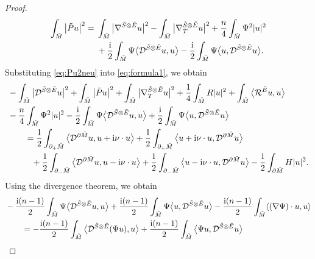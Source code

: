 \documentclass[pdftex]{sigma}
\numberwithin{equation}{section}
\begin{document}
\begin{proof}
\begin{align}
\int_{\tilde{M}} \big|\tilde{P} u\big|^2
={}& \int_{\tilde{M}} \big|\nabla^{\tilde{S} \otimes \tilde{E}} u\big|^2 - \int_{\tilde{M}} \big|\nabla_T^{\tilde{S} \otimes \tilde{E}} u\big|^2 + \frac{n}{4} \int_{\tilde{M}} \Psi^2 |u|^2\nonumber \\
& + \frac{\rm i}{2} \int_{\tilde{M}} \Psi \big\langle \mathcal{D}^{\tilde{S} \otimes \tilde{E}} u,u \big\rangle - \frac{\rm i}{2} \int_{\tilde{M}} \Psi \big\langle u,\mathcal{D}^{\tilde{S} \otimes \tilde{E}} u \big\rangle.\label{eq:Pu2neu}
\end{align}
Substituting \eqref{eq:Pu2neu} into \eqref{eq:formula1}, we obtain
\begin{align}
&- \int_{\tilde{M}} \big|\mathcal{D}^{\tilde{S} \otimes \tilde{E}} u\big|^2 + \int_{\tilde{M}} \big|\tilde{P} u\big|^2 + \int_{\tilde{M}} \big|\nabla_T^{\tilde{S} \otimes \tilde{E}} u\big|^2 + \frac{1}{4} \int_{\tilde{M}} R |u|^2
+ \int_{\tilde{M}} \big\langle \mathcal{R}^{\tilde{E}} u,u \big\rangle \nonumber\\
&- \frac{n}{4} \int_{\tilde{M}} \Psi^2 |u|^2
 - \frac{\rm i}{2} \int_{\tilde{M}} \Psi \big\langle \mathcal{D}^{\tilde{S} \otimes \tilde{E}} u,u \big\rangle + \frac{\rm i}{2} \int_{\tilde{M}} \Psi \big\langle u,\mathcal{D}^{\tilde{S} \otimes \tilde{E}} u \big\rangle\nonumber \\
&\qquad= \frac{1}{2} \int_{\partial_+ \tilde{M}} \big\langle \mathcal{D}^{\partial \tilde{M}} u,u + {\rm i} \nu \cdot u \big\rangle + \frac{1}{2} \int_{\partial_+ \tilde{M}} \big\langle u + {\rm i} \nu \cdot u,\mathcal{D}^{\partial \tilde{M}} u \big\rangle\nonumber \\
&\qquad\phantom{=}{} + \frac{1}{2} \int_{\partial_- \tilde{M}} \big\langle \mathcal{D}^{\partial \tilde{M}} u,u - {\rm i} \nu \cdot u \big\rangle + \frac{1}{2} \int_{\partial_- \tilde{M}} \big\langle u - {\rm i} \nu \cdot u,\mathcal{D}^{\partial \tilde{M}} u \big\rangle - \frac{1}{2} \int_{\partial \tilde{M}} H |u|^2.\label{eq:formula2}
\end{align}
Using the divergence theorem, we obtain
\begin{align}
&- \frac{{\rm i}(n-1)}{2} \int_{\tilde{M}} \Psi \big\langle \mathcal{D}^{\tilde{S} \otimes \tilde{E}} u,u \big\rangle + \frac{{\rm i}(n-1)}{2} \int_{\tilde{M}} \Psi \big\langle u,\mathcal{D}^{\tilde{S} \otimes \tilde{E}} u \big\rangle
- \frac{{\rm i}(n-1)}{2} \int_{\tilde{M}} \langle (\nabla \Psi) \cdot u,u \rangle\nonumber \\
&\qquad= - \frac{{\rm i}(n-1)}{2} \int_{\tilde{M}} \big\langle \mathcal{D}^{\tilde{S} \otimes \tilde{E}} (\Psi u),u \big\rangle + \frac{{\rm i}(n-1)}{2} \int_{\tilde{M}} \big\langle \Psi u,\mathcal{D}^{\tilde{S} \otimes \tilde{E}} u \big\rangle\nonumber \\

\end{align}
\end{proof}
\end{document}
